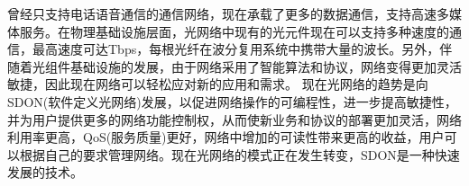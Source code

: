 \documentclass[degree=project,degree-type=project,cjk-font=noto]{thuthesis}
\begin{document}
曾经只支持电话语音通信的通信网络，现在承载了更多的数据通信，支持高速多媒体服务。在物理基础设施层面，光网络中现有的光元件现在可以支持多种速度的通信，最高速度可达Tbps，每根光纤在波分复用系统中携带大量的波长。另外，伴随着光组件基础设施的发展，由于网络采用了智能算法和协议，网络变得更加灵活敏捷，因此现在网络可以轻松应对新的应用和需求。 现在光网络的趋势是向SDON(软件定义光网络)发展，以促进网络操作的可编程性，进一步提高敏捷性，并为用户提供更多的网络功能控制权，从而使新业务和协议的部署更加灵活，网络利用率更高，QoS(服务质量)更好，网络中增加的可读性带来更高的收益，用户可以根据自己的要求管理网络。现在光网络的模式正在发生转变，SDON是一种快速发展的技术。


\backmatter


\appendix
\end{document}
